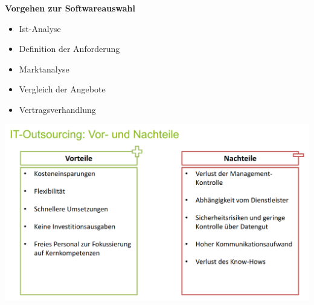 \documentclass[a4]{scrartcl}
\begin{document}
\textbf{Vorgehen zur Softwareauswahl}

\begin{itemize}
\item Ist-Analyse
\item Definition der Anforderung
\item Marktanalyse
\item Vergleich der Angebote
\item Vertragsverhandlung
\end{itemize}



\includegraphics[scale=0.3]{out.png}
\end{document}
